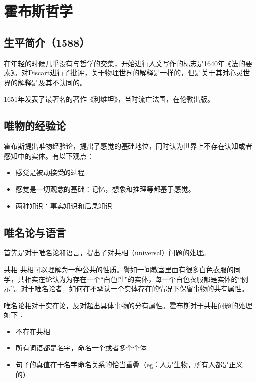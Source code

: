 \section{霍布斯哲学}

\subsection{生平简介（1588）}

在年轻的时候几乎没有与哲学的交集，开始进行人文写作的标志是1640年《法的要素》。对Discart进行了批评，关于物理世界的解释是一样的，但是关于其对心灵世界的解释是及其不认同的。

1651年发表了最著名的著作《利维坦》，当时流亡法国，在伦敦出版。

\subsection{唯物的经验论}

霍布斯提出唯物经验论，提出了感觉的基础地位，同时认为世界上不存在认知或者感知中的实体。有以下观点：

\begin{itemize}
    \item 感觉是被动接受的过程
    \item 感觉是一切观念的基础：记忆，想象和推理等都基于感觉。
    \item 两种知识：事实知识和后果知识
\end{itemize}

\subsection{唯名论与语言}

首先是对于唯名论和语言，提出了对共相（universal）问题的处理。

\begin{fancybox}{共相}
    共相可以理解为一种公共的性质。譬如一间教室里面有很多白色衣服的同学，共相实在论认为为存在一个“白色性”的实体，每一个白色衣服都是实体的“例示”。对于唯名论者，如何在不承认一个实体存在的情况下保留事物的共有属性。
\end{fancybox}

唯名论相对于实在论，反对超出具体事物的分有属性。霍布斯对于共相问题的处理如下：

\begin{itemize}
    \item 不存在共相
    \item 所有词语都是名字，命名一个或者多个个体
    \item 句子的真值在于名字命名关系的恰当重叠（eg：人是生物，所有人都是正义的）
\end{itemize}

